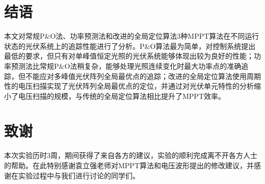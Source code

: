 \documentclass[a4paper,12pt]{article}
\begin{document}
    \section{结语} %
    \label{sec:结语}
    本文对常规P\&O法、功率预测法和改进的全局定位算法3种MPPT算法在不同运行状态的光伏系统上的追踪性能进行了分析。P\&O算法最为简单，对控制系统提出最低的要求，但只有对单峰值恒定光照的光伏系统能够体现出较为良好的性能；功率预测法比常规P\&O法稍复杂，能够处理光照连续变化时最大功率点的准确追踪，但不能应对多峰值光伏阵列全局最优点的追踪；改进的全局定位算法使用周期性的电压扫描实现了光伏阵列全局最优点的定位，并通过对光伏单元特性的分析缩小了电压扫描的规模，与传统的全局定位算法相比提升了MPPT效率。
    
    \section{致谢} %
    \label{sec:致谢}
    本次实验历时3周，期间获得了来自各方的建议，实验的顺利完成离不开各方人士的帮助。在此特别感谢袁立强老师对MPPT算法和电压波形提出的修改建议，并感谢在实验过程中与我们进行讨论的同学们。
    
    \newpage
    
    
\end{document}

